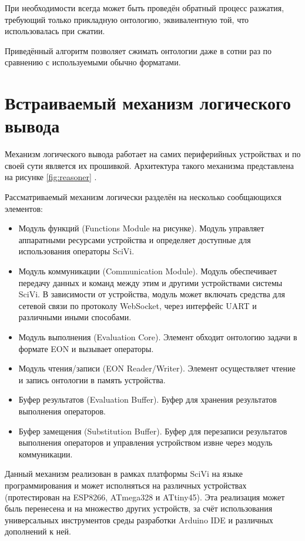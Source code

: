 При необходимости всегда может быть проведён обратный процесс разжатия, требующий только прикладную онтологию, эквивалентную той, что использовалась при сжатии.

Приведённый алгоритм позволяет сжимать онтологии даже в сотни раз по сравнению с используемыми обычно форматами.

\section{Встраиваемый механизм логического вывода}

Механизм логического вывода работает на самих периферийных устройствах и по своей сути является их прошивкой.
Архитектура такого механизма представлена на рисунке \ref{fig:reasoner} \cite{incollection:onto-reasoning-on-mcu}.


Рассматриваемый механизм логически разделён на несколько сообщающихся элементов:
\begin{itemize}
	\item Модуль функций (Functions Module на рисунке). Модуль управляет аппаратными ресурсами устройства и определяет доступные для использования операторы SciVi.
	\item Модуль коммуникации (Communication Module). Модуль обеспечивает передачу данных и команд между этим и другими устройствами системы SciVi.
	      В зависимости от устройства, модуль может включать средства для сетевой связи по протоколу WebSocket, через интерфейс UART и различными иными способами.
	\item Модуль выполнения (Evaluation Core). Элемент обходит онтологию задачи в формате EON и вызывает операторы.
	\item Модуль чтения/записи (EON Reader/Writer). Элемент осуществляет чтение и запись онтологии в память устройства.
	\item Буфер результатов (Evaluation Buffer). Буфер для хранения результатов выполнения операторов.
	\item Буфер замещения (Substitution Buffer). Буфер для перезаписи результатов выполнения операторов и управления устройством извне через модуль коммуникации.
\end{itemize}

Данный механизм реализован в рамках платформы SciVi на языке программирования \CPP и может исполняться на различных устройствах (протестирован на ESP8266, ATmega328 и ATtiny45).
Эта реализация может быль перенесена и на множество других устройств, за счёт использования универсальных инструментов среды разработки Arduino IDE и различных дополнений к ней.

